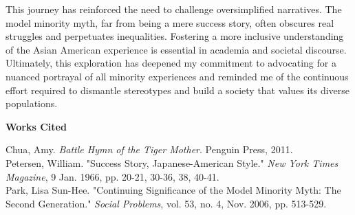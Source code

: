 \documentclass[12pt]{article}
\begin{document}
This journey has reinforced the need to challenge oversimplified narratives. The model minority myth, far from being a mere success story, often obscures real struggles and perpetuates inequalities. Fostering a more inclusive understanding of the Asian American experience is essential in academia and societal discourse. Ultimately, this exploration has deepened my commitment to advocating for a nuanced portrayal of all minority experiences and reminded me of the continuous effort required to dismantle stereotypes and build a society that values its diverse populations.





\newpage
\begin{center}
  \textbf{Works Cited}
\end{center}

\begin{flushleft}
  Chua, Amy. \textit{Battle Hymn of the Tiger Mother}. Penguin Press, 2011. \\
  Petersen, William. "Success Story, Japanese-American Style." \textit{New York Times Magazine}, 9 Jan. 1966, pp. 20-21, 30-36, 38, 40-41. \\
  Park, Lisa Sun-Hee. "Continuing Significance of the Model Minority Myth: The Second Generation." \textit{Social Problems}, vol. 53, no. 4, Nov. 2006, pp. 513-529.
\end{flushleft}
\end{document}

